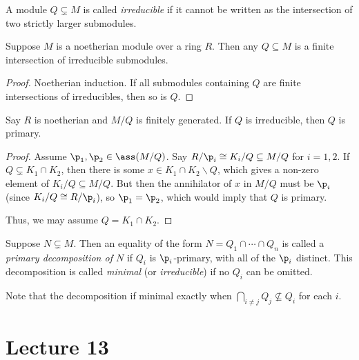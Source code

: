  \begin{definition}
   A module $Q\subsetneq M$ is called \emph{irreducible} if it cannot be written as the
   intersection of two strictly larger submodules.
 \end{definition}
 \begin{lemma}
   Suppose $M$ is a noetherian module over a ring $R$. Then any $Q\subseteq M$ is a
   finite intersection of irreducible submodules.
 \end{lemma}
 \begin{proof}
   Noetherian induction. If all submodules containing $Q$ are finite intersections of
   irreducibles, then so is $Q$.
 \end{proof}
 \begin{theorem}
   Say $R$ is noetherian and $M/Q$ is finitely generated. If $Q$ is irreducible, then $Q$
   is primary.
 \end{theorem}
 \begin{proof}
   Assume $\p_1,\p_2\in \ass (M/Q)$. Say $R/\p_i \cong K_i/Q \subseteq M/Q$ for $i=1,2$.
   If $Q\subsetneq K_1\cap K_2$, then there is some $x\in K_1\cap K_2\smallsetminus Q$,
   which gives a non-zero element of $K_i/Q\subseteq M/Q$. But then the annihilator of
   $x$ in $M/Q$ must be $\p_i$ (since $K_i/Q\cong R/\p_i$), so $\p_1=\p_2$, which would
   imply that $Q$ is primary.

   Thus, we may assume $Q=K_1\cap K_2$. 
 \end{proof}
 \begin{definition}
   Suppose $N\subsetneq M$. Then an equality of the form $N=Q_1\cap \cdots \cap Q_n$ is
   called a \emph{primary decomposition of $N$} if $Q_i$ is $\p_i$-primary, with all of
   the $\p_i$ distinct. This decomposition is called \emph{minimal} (or
   \emph{irreducible}) if no $Q_i$ can be omitted.
 \end{definition}
 Note that the decomposition if minimal exactly when $\bigcap_{i\neq j} Q_j\not\subseteq
 Q_i$ for each $i$.
 \setcounter{lecture}{13}
 \section{Lecture 13}

